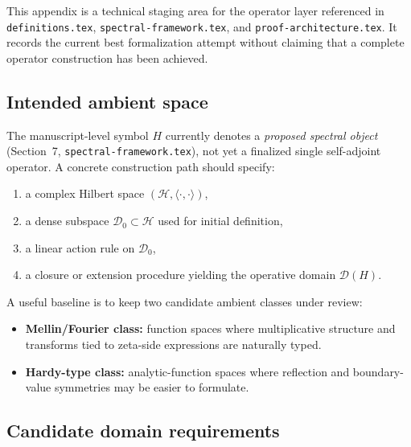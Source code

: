 This appendix is a technical staging area for the operator layer referenced in
\texttt{definitions.tex}, \texttt{spectral-framework.tex}, and
\texttt{proof-architecture.tex}. It records the current best formalization
attempt without claiming that a complete operator construction has been achieved.


\subsection{Intended ambient space}

The manuscript-level symbol $H$ currently denotes a \emph{proposed spectral
object} (Section~7, \texttt{spectral-framework.tex}), not yet a finalized
single self-adjoint operator. A concrete construction path should specify:
\begin{enumerate}
  \item a complex Hilbert space $(\mathcal{H},\langle\cdot,\cdot\rangle)$,
  \item a dense subspace $\mathcal{D}_0\subset\mathcal{H}$ used for initial
  definition,
  \item a linear action rule on $\mathcal{D}_0$,
  \item a closure or extension procedure yielding the operative domain
  $\mathcal{D}(H)$.
\end{enumerate}

A useful baseline is to keep two candidate ambient classes under review:
\begin{itemize}
  \item \textbf{Mellin/Fourier class:} function spaces where multiplicative
  structure and transforms tied to zeta-side expressions are naturally typed.
  \item \textbf{Hardy-type class:} analytic-function spaces where reflection and
  boundary-value symmetries may be easier to formulate.
\end{itemize}


\subsection{Candidate domain requirements}

